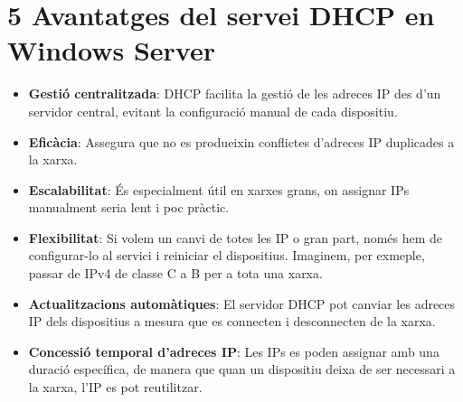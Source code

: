 \documentclass[
  a4paper,
]{article}
\providecommand{\tightlist}{%
  \setlength{\itemsep}{0pt}\setlength{\parskip}{0pt}}
\begin{document}
\section{5 Avantatges del servei DHCP en Windows
Server}\label{avantatges-del-servei-dhcp-en-windows-server}

\begin{itemize}
\tightlist
\item
  \textbf{Gestió centralitzada}: DHCP facilita la gestió de les adreces
  IP des d'un servidor central, evitant la configuració manual de cada
  dispositiu.
\item
  \textbf{Eficàcia}: Assegura que no es produeixin conflictes d'adreces
  IP duplicades a la xarxa.
\item
  \textbf{Escalabilitat}: És especialment útil en xarxes grans, on
  assignar IPs manualment seria lent i poc pràctic.
\item
  \textbf{Flexibilitat}: Si volem un canvi de totes les IP o gran part,
  només hem de configurar-lo al servici i reiniciar el dispositius.
  Imaginem, per exmeple, passar de IPv4 de classe C a B per a tota una
  xarxa.
\item
  \textbf{Actualitzacions automàtiques}: El servidor DHCP pot canviar
  les adreces IP dels dispositius a mesura que es connecten i
  desconnecten de la xarxa.
\item
  \textbf{Concessió temporal d'adreces IP}: Les IPs es poden assignar
  amb una duració específica, de manera que quan un dispositiu deixa de
  ser necessari a la xarxa, l'IP es pot reutilitzar.
\end{itemize}
\end{document}
